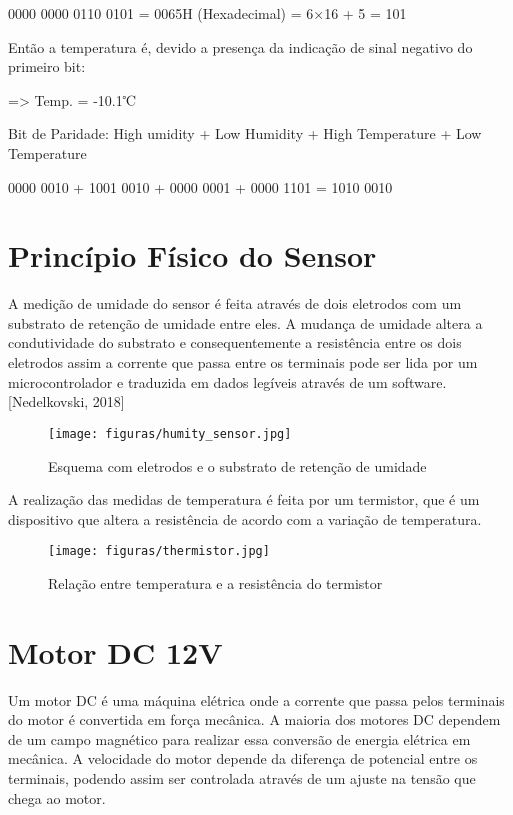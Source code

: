 0000 0000 0110 0101 = 0065H (Hexadecimal) = 6×16 + 5  = 101  

Então a temperatura é, devido a presença da indicação de sinal negativo do primeiro bit:

=> Temp. = -10.1℃ 

Bit de Paridade: High umidity + Low Humidity + High Temperature + Low Temperature

0000 0010 + 1001 0010 + 0000 0001 + 0000 1101 = 1010 0010

\section{Princípio Físico do Sensor}

A medição de umidade do sensor é feita através de dois eletrodos com um substrato de retenção de umidade entre eles. A mudança de umidade altera a condutividade do substrato e consequentemente a resistência entre os dois eletrodos assim a corrente que passa entre os terminais pode ser lida por um microcontrolador e traduzida em dados legíveis através de um software\cite{ned2017}.[Nedelkovski, 2018]

\begin{figure}[H]
	\centering
	\texttt{[image: figuras/humity\_sensor.jpg]}
	\caption{Esquema com eletrodos e o substrato de retenção de umidade}
	\label{humity_sensor}
\end{figure}

A realização das medidas de temperatura é feita por um termistor, que é um dispositivo que altera a resistência de acordo com a variação de temperatura.

\begin{figure}[H]
	\centering
	\texttt{[image: figuras/thermistor.jpg]}
	\caption{Relação entre temperatura e a resistência do termistor}
	\label{thermistor}
\end{figure}

\section{Motor DC 12V}

Um motor DC é uma máquina elétrica onde a corrente que passa pelos terminais do motor é convertida em força mecânica. A maioria dos motores DC dependem de um campo magnético para realizar essa conversão de energia elétrica em mecânica. A velocidade do motor depende da diferença de potencial entre os terminais, podendo assim ser controlada  através de um ajuste na tensão que chega ao motor\cite{metmotor2015}.

